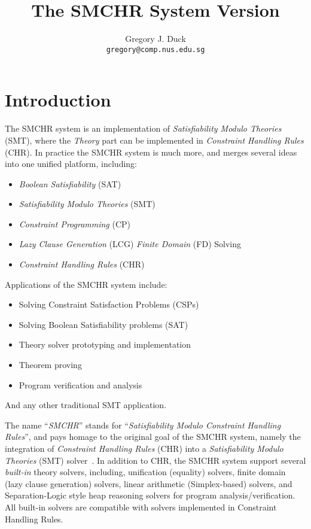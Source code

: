 \documentclass{article}
\title{The SMCHR System Version }
\author{Gregory J. Duck \\
\texttt{gregory@comp.nus.edu.sg}}
\date{}
\begin{document}
\maketitle
\newpage

\tableofcontents
\newpage

\section{Introduction}

The SMCHR system is an implementation of \emph{Satisfiability Modulo
Theories} (SMT), where the \emph{Theory} part can be implemented in
\emph{Constraint Handling Rules} (CHR).
In practice the SMCHR system is much more, and merges
several ideas into one unified platform, including:
\begin{itemize}[noitemsep,topsep=0pt,parsep=0pt,partopsep=0pt]
    \item \emph{Boolean Satisfiability} (SAT)
    \item \emph{Satisfiability Modulo Theories} (SMT)
    \item \emph{Constraint Programming} (CP)
    \item \emph{Lazy Clause Generation} (LCG) \emph{Finite Domain} (FD) Solving
    \item \emph{Constraint Handling Rules} (CHR)
\end{itemize}
Applications of the SMCHR system include:
\begin{itemize}[noitemsep,topsep=0pt,parsep=0pt,partopsep=0pt]
    \item Solving Constraint Satisfaction Problems (CSPs)
    \item Solving Boolean Satisfiability problems (SAT)
    \item Theory solver prototyping and implementation
    \item Theorem proving
    \item Program verification and analysis
\end{itemize}
And any other traditional SMT application.

The name ``\emph{SMCHR}'' stands for
``\emph{Satisfiability Modulo Constraint Handling Rules}'', and pays homage to
the original goal of the SMCHR system, namely
the integration of \emph{Constraint Handling Rules} (CHR)
into a \emph{Satisfiability Modulo Theories} (SMT) solver~\cite{smchr, smchr2}.
In addition to CHR, the SMCHR system support several \emph{built-in}
theory solvers, including, unification (equality) solvers,
finite domain (lazy clause generation) solvers,
linear arithmetic (Simplex-based) solvers, and
Separation-Logic style heap reasoning solvers for program
analysis/verification.
All built-in solvers are compatible with solvers implemented in Constraint
Handling Rules.
\end{document}
